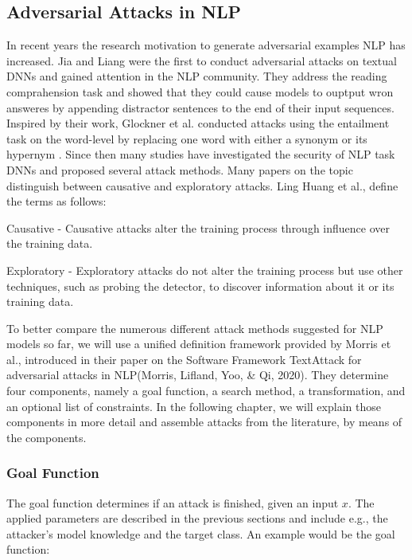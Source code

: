 \subsection{Adversarial Attacks in NLP}
    \label{sec:adv-ex_in_NLP}
    
In recent years the research motivation to generate adversarial examples NLP has increased. Jia and Liang were the first to conduct adversarial attacks on textual DNNs and gained attention in the NLP community\cite{Jia2017AdversarialEF}. They address the reading comprahension task and showed that they could cause models to ouptput wron answeres by appending distractor sentences to the end of their input sequences. Inspired by their work, Glockner et al. conducted attacks using the entailment task on the word-level by replacing one word with either a synonym or its hypernym \cite{glockner2018breaking}. Since then many studies have investigated the security of NLP task DNNs and proposed several attack methods. Many papers on the topic distinguish between causative and exploratory attacks. Ling Huang et al., define the terms as follows:

Causative -  Causative attacks alter the training process through influence over the training data.

Exploratory - Exploratory attacks do not alter the training process but use other techniques, such as probing the detector, to discover information about it or its training data.
\cite{huang2011adversarial}

To better compare the numerous different attack methods suggested for NLP models so far, we will use a unified definition framework provided by Morris et al., introduced in their paper on the Software Framework TextAttack for adversarial attacks in NLP(Morris, Lifland, Yoo, & Qi, 2020). They determine four components, namely a goal function, a search method, a transformation, and an optional list of constraints. In the following chapter, we will explain those components in more detail and assemble attacks from the literature, by means of the components.


\subsubsection{Goal Function}
The goal function determines if an attack is finished, given an input $x$. 
The applied parameters are described in the previous sections and include e.g., the attacker's model knowledge and the target class.
An example would be the goal function:

